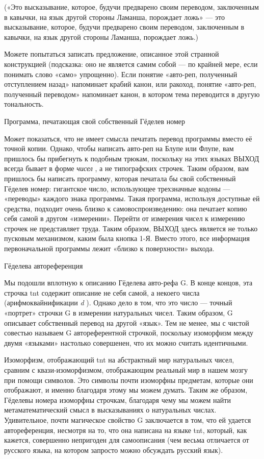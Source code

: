 \documentclass[../main.tex]{subfiles}
\begin{document}
(«Это высказывание, которое, будучи предварено своим переводом, заключенным в кавычки, на язык другой стороны Ламанша, порождает ложь» --- это высказывание, которое, будучи предварено своим переводом, заключенным в кавычки, на язык другой стороны Ламанша, порождает ложь.)

Можете попытаться записать предложение, описанное этой странной конструкцией (подсказка: оно не является самим собой --- по крайней мере, если понимать слово «само» упрощенно). Если понятие «авто-реп, полученный отступлением назад» напоминает крабий канон, или ракоход, понятие «авто-реп, полученный переводом» напоминает канон, в котором тема переводится в другую тональность.

Программа, печатающая свой собственный Гёделев номер

Может показаться, что не имеет смысла печатать перевод программы вместо её точной копии. Однако, чтобы написать авто-реп на Блупе или Флупе, вам пришлось бы прибегнуть к подобным трюкам, поскольку на этих языках ВЫХОД всегда бывает в форме \emph{чисел} , а не типографских строчек. Таким образом, вам пришлось бы написать программу, которая печатала бы свой собственный Гёделев номер: гигантское число, использующее трехзначные кодоны --- «переводы» каждого знака программы. Такая программа, используя доступные ей средства, подходит очень близко к самовоспроизведению: она печатает копию себя самой в другом «измерении». Перейти от измерения чисел к измерению строчек не представляет труда. Таким образом, ВЫХОД здесь является не только пусковым механизмом, каким была кнопка 1-Я. Вместо этого, все информация первоначальной программы лежит «близко к поверхности» выхода.

Гёделева автореференция

Мы подошли вплотную к описанию Гёделева авто-рефа G. В конце концов, эта строчка \acs{tnt} содержит описание не себя самой, а некоего числа (арифмоквайнификации \emph{d} ). Однако дело в том, что это число --- точный «портрет» строчки G в измерении натуральных чисел. Таким образом, G описывает собственный перевод на другой «язык». Тем не менее, мы с чистой совестью называем G автореферентной строчкой, поскольку изоморфизм между двумя «языками» настолько совершенен, что их можно считать идентичными.

Изоморфизм, отображающий \acs{tnt} на абстрактный мир натуральных чисел, сравним с квази-изоморфизмом, отображающим реальный мир в нашем мозгу при помощи символов. Это символы почти изоморфны предметам, которые они отображают, и именно благодаря этому мы можем думать. Таким же образом, Гёделевы номера изоморфны строчкам, благодаря чему мы можем найти метаматематический смысл в высказываниях о натуральных числах. Удивительное, почти магическое свойство G заключается в том, что ей удается автореференция, несмотря на то, что она написана на языке \acs{tnt}, который, как кажется, совершенно непригоден для самоописания (чем весьма отличается от русского языка, на котором запросто можно обсуждать русский язык).
\end{document}
